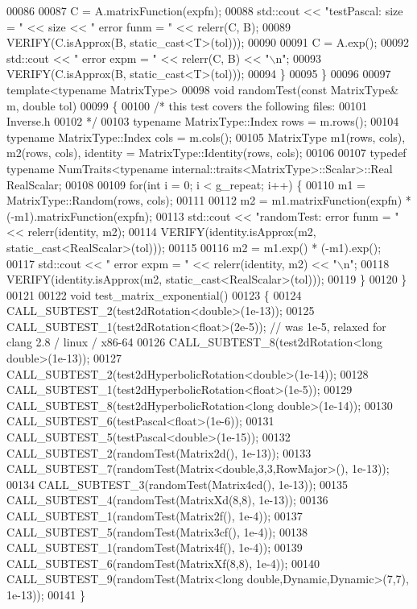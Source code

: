 \begin{DoxyCode}
00086 
00087     C = A.matrixFunction(expfn);
00088     std::cout << \textcolor{stringliteral}{"testPascal: size = "} << size << \textcolor{stringliteral}{"   error funm = "} << relerr(C, B);
00089     VERIFY(C.isApprox(B, static\_cast<T>(tol)));
00090 
00091     C = A.exp();
00092     std::cout << \textcolor{stringliteral}{"   error expm = "} << relerr(C, B) << \textcolor{stringliteral}{"\(\backslash\)n"};
00093     VERIFY(C.isApprox(B, static\_cast<T>(tol)));
00094   \}
00095 \}
00096 
00097 \textcolor{keyword}{template}<\textcolor{keyword}{typename} MatrixType>
00098 \textcolor{keywordtype}{void} randomTest(\textcolor{keyword}{const} MatrixType& m, \textcolor{keywordtype}{double} tol)
00099 \{
00100   \textcolor{comment}{/* this test covers the following files:}
00101 \textcolor{comment}{     Inverse.h}
00102 \textcolor{comment}{  */}
00103   \textcolor{keyword}{typename} MatrixType::Index rows = m.rows();
00104   \textcolor{keyword}{typename} MatrixType::Index cols = m.cols();
00105   MatrixType m1(rows, cols), m2(rows, cols), identity = MatrixType::Identity(rows, cols);
00106 
00107   \textcolor{keyword}{typedef} \textcolor{keyword}{typename} NumTraits<typename internal::traits<MatrixType>::Scalar>::Real RealScalar;
00108 
00109   \textcolor{keywordflow}{for}(\textcolor{keywordtype}{int} i = 0; i < g\_repeat; i++) \{
00110     m1 = MatrixType::Random(rows, cols);
00111 
00112     m2 = m1.matrixFunction(expfn) * (-m1).matrixFunction(expfn);
00113     std::cout << \textcolor{stringliteral}{"randomTest: error funm = "} << relerr(identity, m2);
00114     VERIFY(identity.isApprox(m2, static\_cast<RealScalar>(tol)));
00115 
00116     m2 = m1.exp() * (-m1).exp();
00117     std::cout << \textcolor{stringliteral}{"   error expm = "} << relerr(identity, m2) << \textcolor{stringliteral}{"\(\backslash\)n"};
00118     VERIFY(identity.isApprox(m2, static\_cast<RealScalar>(tol)));
00119   \}
00120 \}
00121 
00122 \textcolor{keywordtype}{void} test\_matrix\_exponential()
00123 \{
00124   CALL\_SUBTEST\_2(test2dRotation<double>(1e-13));
00125   CALL\_SUBTEST\_1(test2dRotation<float>(2e-5));  \textcolor{comment}{// was 1e-5, relaxed for clang 2.8 / linux / x86-64}
00126   CALL\_SUBTEST\_8(test2dRotation<long double>(1e-13)); 
00127   CALL\_SUBTEST\_2(test2dHyperbolicRotation<double>(1e-14));
00128   CALL\_SUBTEST\_1(test2dHyperbolicRotation<float>(1e-5));
00129   CALL\_SUBTEST\_8(test2dHyperbolicRotation<long double>(1e-14));
00130   CALL\_SUBTEST\_6(testPascal<float>(1e-6));
00131   CALL\_SUBTEST\_5(testPascal<double>(1e-15));
00132   CALL\_SUBTEST\_2(randomTest(Matrix2d(), 1e-13));
00133   CALL\_SUBTEST\_7(randomTest(Matrix<double,3,3,RowMajor>(), 1e-13));
00134   CALL\_SUBTEST\_3(randomTest(Matrix4cd(), 1e-13));
00135   CALL\_SUBTEST\_4(randomTest(MatrixXd(8,8), 1e-13));
00136   CALL\_SUBTEST\_1(randomTest(Matrix2f(), 1e-4));
00137   CALL\_SUBTEST\_5(randomTest(Matrix3cf(), 1e-4));
00138   CALL\_SUBTEST\_1(randomTest(Matrix4f(), 1e-4));
00139   CALL\_SUBTEST\_6(randomTest(MatrixXf(8,8), 1e-4));
00140   CALL\_SUBTEST\_9(randomTest(Matrix<long double,Dynamic,Dynamic>(7,7), 1e-13));
00141 \}
\end{DoxyCode}
